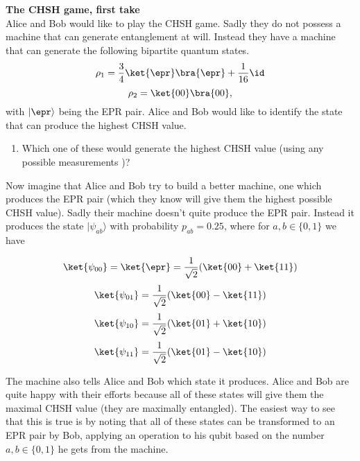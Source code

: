 \chapter{}


\begin{exercises}

\item {\bf The CHSH game, first take}\\
Alice and Bob would like to play the CHSH game. Sadly they do not possess a machine that can generate entanglement at will. Instead they have a machine that can generate the following bipartite quantum states.
\[\rho_1 = \frac{3}{4}\ket{\epr}\bra{\epr} + \frac{1}{16} \id\]
\[\rho_2 = \ket{00}\bra{00},\]
with \(|\epr\rangle\) being the EPR pair. Alice and Bob would like to identify the state that can produce the highest CHSH value.
\begin{enumerate}
\item Which one of these would generate the highest CHSH value (using any possible measurements )?
\end{enumerate}
Now imagine that Alice and Bob try to build a better machine, one which produces the EPR pair (which they know will give them the highest possible CHSH value). Sadly their machine doesn't quite produce the EPR pair. Instead it produces the state \(|\psi_{ab}\rangle\) with probability \(p_{ab} = 0.25\), where for $a,b\in \{0,1\}$ we have

\[\ket{\psi_{00}} = \ket{\epr}=\frac{1}{\sqrt{2}}(\ket{00} + \ket{11})\]
\[\ket{\psi_{01}} = \frac{1}{\sqrt{2}}(\ket{00} - \ket{11})\]
\[\ket{\psi_{10}} = \frac{1}{\sqrt{2}}(\ket{01} + \ket{10})\]
\[\ket{\psi_{11}} = \frac{1}{\sqrt{2}}(\ket{01} - \ket{10})\]

The machine also tells Alice and Bob which state it produces. Alice and Bob are quite happy with their efforts because all of these states will give them the maximal CHSH value (they are maximally entangled). The easiest way to see that this is true is by noting that all of these states can be transformed to an EPR pair by Bob, applying an operation to his qubit based on the number \(a,b\in\{0,1\}\) he gets from the machine. 


\end{exercises}
